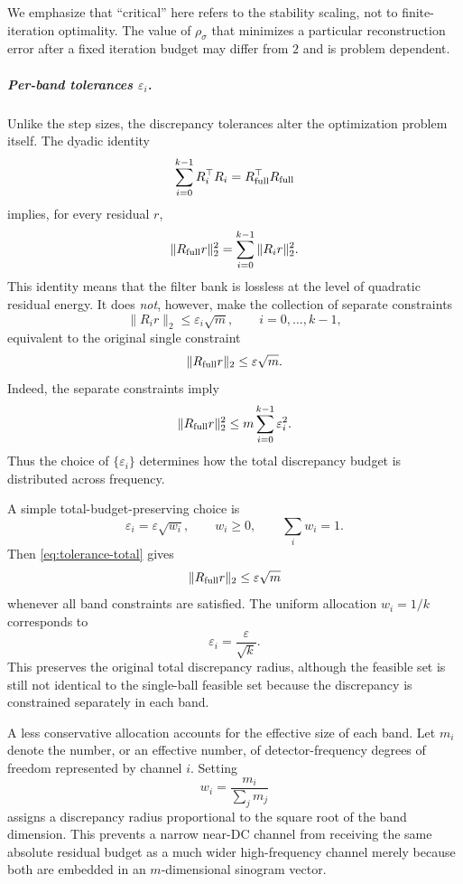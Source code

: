 \documentclass{article}
\begin{document}
We emphasize that ``critical'' here refers to the stability scaling,
not to finite-iteration optimality.  The value of $\rho_\sigma$ that
minimizes a particular reconstruction error after a fixed iteration
budget may differ from $2$ and is problem dependent.

\subparagraph{Per-band tolerances $\varepsilon_i$.}
Unlike the step sizes, the discrepancy tolerances alter the
optimization problem itself.  The dyadic identity
\begin{equation}
\label{eq:dyadic-energy-identity}
\sum_{i=0}^{k-1}
R_i^\top R_i
=
R_{\rm full}^\top R_{\rm full}
\end{equation}
implies, for every residual $r$,
\begin{equation}
\label{eq:dyadic-residual-energy}
\|R_{\rm full}r\|_2^2
=
\sum_{i=0}^{k-1}\|R_ir\|_2^2.
\end{equation}
This identity means that the filter bank is lossless at the level of
quadratic residual energy.  It does \emph{not}, however, make the
collection of separate constraints
\[
\|R_ir\|_2\le\varepsilon_i\sqrt m,
\qquad i=0,\ldots,k-1,
\]
equivalent to the original single constraint
\[
\|R_{\rm full}r\|_2\le\varepsilon\sqrt m.
\]
Indeed, the separate constraints imply
\begin{equation}
\label{eq:tolerance-total}
\|R_{\rm full}r\|_2^2
\le
m\sum_{i=0}^{k-1}\varepsilon_i^2.
\end{equation}
Thus the choice of $\{\varepsilon_i\}$ determines how the total
discrepancy budget is distributed across frequency.

A simple total-budget-preserving choice is
\begin{equation}
\label{eq:tolerance-budget}
\varepsilon_i
=
\varepsilon\sqrt{w_i},
\qquad
w_i\ge0,
\qquad
\sum_iw_i=1.
\end{equation}
Then \eqref{eq:tolerance-total} gives
\[
\|R_{\rm full}r\|_2
\le
\varepsilon\sqrt m
\]
whenever all band constraints are satisfied.
The uniform allocation $w_i=1/k$ corresponds to
\[
\varepsilon_i=\frac{\varepsilon}{\sqrt{k}}.
\]
This preserves the original total discrepancy radius, although the
feasible set is still not identical to the single-ball feasible set
because the discrepancy is constrained separately in each band.

A less conservative allocation accounts for the effective size of
each band.  Let $m_i$ denote the number, or an effective number, of
detector-frequency degrees of freedom represented by channel $i$.
Setting
\begin{equation}
\label{eq:tolerance-dof}
w_i=\frac{m_i}{\sum_jm_j}
\end{equation}
assigns a discrepancy radius proportional to the square root of the
band dimension.  This prevents a narrow near-DC channel from receiving
the same absolute residual budget as a much wider high-frequency
channel merely because both are embedded in an $m$-dimensional
sinogram vector.
\end{document}
